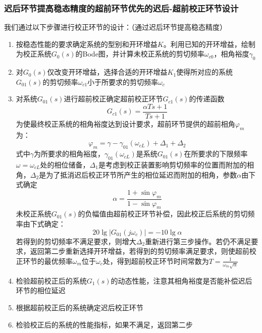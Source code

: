 \subsubsection{迟后环节提高稳态精度的超前环节优先的迟后-超前校正环节设计}

我们通过以下步骤进行校正环节的设计：（通过迟后环节提高稳态精度）
\begin{enumerate}
    \item 按稳态性能的要求确定系统的型别和开环增益$K$。利用已知的开环增益，绘制为校正系统$G_0(s)$的Bode图，并计算未校正系统的剪切频率$\omega_{c0}$，相角裕度$\gamma_0$
    \item 对$G_0(s)$仅改变开环增益，选择合适的开环增益$K_1$使得所对应的系统$G_{01}(s)$的剪切频率$\omega_{c1}$小于所要求的剪切频率$\omega_c$
    \item 对系统$G_{01}(s)$进行超前校正确定超前校正环节$G_{c1}(s)$的传递函数
    \begin{equation*}
        G_{c1}(s) = \frac{\alpha T s + 1}{Ts+1}
    \end{equation*}
    为使最终校正系统的相角裕度达到设计要求，超前环节提供的超前相角$\varphi_m$为：
    \begin{equation*}
        \varphi_m = \gamma - \gamma_{01}(\omega_{cL}) + \Delta_1 + \Delta_2
    \end{equation*}
    式中$\gamma$为所要求的相角裕度，$\gamma_{01}(\omega_{cL})$是系统$G_{01}(s)$在所要求的下限频率$\omega = \omega_{cL}$处的相位储备，$\Delta_1$是考虑到校正装置影响剪切频率的位置而附加的相角，$\Delta_2$是为了抵消迟后校正环节所产生的相位延迟而附加的相角，参数$\alpha$由下式确定
    \begin{equation*}
        \alpha = \frac{1+\sin\varphi_m}{1-\sin\varphi_m}
    \end{equation*}
    未校正系统$G_{01}(s)$的负幅值由超前校正环节补偿，因此校正后系统的剪切频率由下式确定：
    \begin{equation*}
        20 \lg \left\lvert G_{01}(j \omega_c) \right\rvert = -10 \lg \alpha
    \end{equation*}
    若得到的剪切频率不满足要求，则增大$\Delta_2$重新进行第三步操作。若仍不满足要求，返回第二步重新选择开环增益，若得到的剪切频率满足要求，则使超前校正环节的最优频率$\omega_m$位于$\omega_c$处，得到超前校正环节时间常数为$T = \frac{1}{\omega_m \sqrt{\alpha}}$
    \item 检验超前校正后的系统$G_1(s)$的动态性能，注意其相角裕度是否能补偿迟后环节的相位延迟
    \item 根据超前校正后的系统确定迟后校正环节
    \item 检验校正后的系统的性能指标，如果不满足，返回第二步
\end{enumerate}

